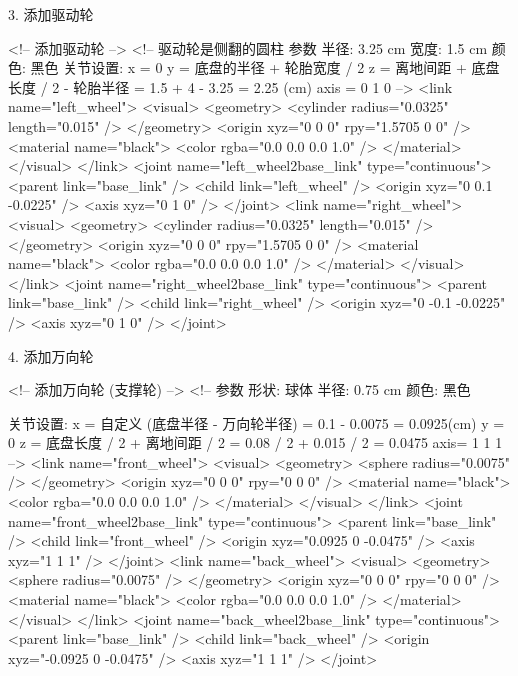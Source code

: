 \documentclass[openany, fontset=windowsold]{ctexbook}
\theoremstyle{kaiti}
\theoremstyle{normal}
\begin{document}
3. 添加驱动轮

\begin{xml}
  <!-- 添加驱动轮 -->
  <!--
      驱动轮是侧翻的圆柱
      参数
          半径: 3.25 cm
          宽度: 1.5  cm
          颜色: 黑色
      关节设置:
          x = 0
          y = 底盘的半径 + 轮胎宽度 / 2
          z = 离地间距 + 底盘长度 / 2 - 轮胎半径 = 1.5 + 4 - 3.25 = 2.25 (cm)
          axis = 0 1 0
  -->
  <link name="left_wheel">
      <visual>
          <geometry>
              <cylinder radius="0.0325" length="0.015" />
          </geometry>
          <origin xyz="0 0 0" rpy="1.5705 0 0" />
          <material name="black">
              <color rgba="0.0 0.0 0.0 1.0" />
          </material>
      </visual>
  </link>
  <joint name="left_wheel2base_link" type="continuous">
      <parent link="base_link" />
      <child link="left_wheel" />
      <origin xyz="0 0.1 -0.0225" />
      <axis xyz="0 1 0" />
  </joint>
  <link name="right_wheel">
      <visual>
          <geometry>
              <cylinder radius="0.0325" length="0.015" />
          </geometry>
          <origin xyz="0 0 0" rpy="1.5705 0 0" />
          <material name="black">
              <color rgba="0.0 0.0 0.0 1.0" />
          </material>
      </visual>
  </link>
  <joint name="right_wheel2base_link" type="continuous">
      <parent link="base_link" />
      <child link="right_wheel" />
      <origin xyz="0 -0.1 -0.0225" />
      <axis xyz="0 1 0" />
  </joint>
\end{xml}

4. 添加万向轮

\begin{xml}
  <!-- 添加万向轮 (支撑轮) -->
  <!--
      参数
          形状: 球体
          半径: 0.75 cm
          颜色: 黑色

      关节设置:
          x = 自定义 (底盘半径 - 万向轮半径) = 0.1 - 0.0075 = 0.0925(cm)
          y = 0
          z = 底盘长度 / 2 + 离地间距 / 2 = 0.08 / 2 + 0.015 / 2 = 0.0475 
          axis= 1 1 1
  -->
  <link name="front_wheel">
      <visual>
          <geometry>
              <sphere radius="0.0075" />
          </geometry>
          <origin xyz="0 0 0" rpy="0 0 0" />
          <material name="black">
              <color rgba="0.0 0.0 0.0 1.0" />
          </material>
      </visual>
  </link>
  <joint name="front_wheel2base_link" type="continuous">
      <parent link="base_link" />
      <child link="front_wheel" />
      <origin xyz="0.0925 0 -0.0475" />
      <axis xyz="1 1 1" />
  </joint>
  <link name="back_wheel">
      <visual>
          <geometry>
              <sphere radius="0.0075" />
          </geometry>
          <origin xyz="0 0 0" rpy="0 0 0" />
          <material name="black">
              <color rgba="0.0 0.0 0.0 1.0" />
          </material>
      </visual>
  </link>
  <joint name="back_wheel2base_link" type="continuous">
      <parent link="base_link" />
      <child link="back_wheel" />
      <origin xyz="-0.0925 0 -0.0475" />
      <axis xyz="1 1 1" />
  </joint>
\end{xml}
\end{document}
